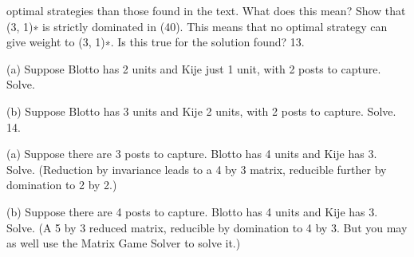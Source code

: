 \documentclass[]{report}
\begin{document}
optimal strategies than those found in the text. What does this mean? Show that (3, 1)∗ is
strictly dominated in (40). This means that no optimal strategy can give weight to (3, 1)∗.
Is this true for the solution found?
13. \item[(a)] Suppose Blotto has 2 units and Kije just 1 unit, with 2 posts to capture.
Solve.
\item[(b)] Suppose Blotto has 3 units and Kije 2 units, with 2 posts to capture. Solve.
14. \item[(a)] Suppose there are 3 posts to capture. Blotto has 4 units and Kije has 3. Solve.
(Reduction by invariance leads to a 4 by 3 matrix, reducible further by domination to 2
by 2.)
\item[(b)] Suppose there are 4 posts to capture. Blotto has 4 units and Kije has 3. Solve.
(A 5 by 3 reduced matrix, reducible by domination to 4 by 3. But you may as well use
the Matrix Game Solver to solve it.)
\end{document}
